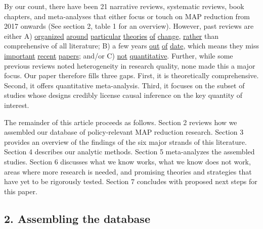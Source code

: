 \documentclass[
  letterpaper,
  DIV=11,
  numbers=noendperiod]{scrartcl}
\begin{document}
By our count, there have been 21 narrative reviews, systematic reviews,
book chapters, and meta-analyses that either focus or touch on MAP
reduction from 2017 onwards (See section 2, table 1 for an overview).
However, past reviews are either A)
\href{https://www.sciencedirect.com/science/article/abs/pii/S0195666318309309}{organized}
\href{https://animalcharityevaluators.org/wp-content/uploads/2022/04/protest-intervention-report.pdf}{around}
\href{https://animalcharityevaluators.org/wp-content/uploads/2022/04/leafleting-intervention-report.pdf}{particular}
\href{https://www.sciencedirect.com/science/article/pii/S0195666321001847}{theories}
\href{https://www.thelancet.com/journals/lanplh/article/PIIS2542-5196(18)30188-8/fulltext}{of}
\href{https://ijbnpa.biomedcentral.com/articles/10.1186/s12966-018-0729-6}{change},
\href{https://www.sciencedirect.com/science/article/abs/pii/B9780323988285000012}{rather}
than comprehensive of all literature; B) a few years
\href{https://www.sciencedirect.com/science/article/abs/pii/S0195666318315812}{out}
\href{https://www.sciencedirect.com/science/article/pii/S0195666321006462}{of}
\href{https://www.sciencedirect.com/science/article/abs/pii/S092422441830606X}{date},
which means they miss
\href{https://doi.org/10.1038/s43016-023-00712-1}{important}
\href{https://faunalytics.org/relative-effectiveness/}{recent}
\href{https://doi.org/10.1016/j.jenvp.2021.10159}{papers}; and/or C)
\href{https://doi.org/10.1016/j.tifs.2019.09.019}{not}
\href{https://www.sciencedirect.com/science/article/pii/S2666833521000976}{quantitative}.
Further, while some previous reviews noted heterogeneity in research
quality, none made this a major focus. Our paper therefore fills three
gaps. First, it is theoretically comprehensive. Second, it offers
quantitative meta-analysis. Third, it focuses on the subset of studies
whose designs credibly license causal inference on the key quantity of
interest.

The remainder of this article proceeds as follows. Section 2 reviews how
we assembled our database of policy-relevant MAP reduction research.
Section 3 provides an overview of the findings of the six major strands
of this literature. Section 4 describes our analytic methods. Section 5
meta-analyzes the assembled studies. Section 6 discusses what we know
works, what we know does not work, areas where more research is needed,
and promising theories and strategies that have yet to be rigorously
tested. Section 7 concludes with proposed next steps for this paper.

\hypertarget{assembling-the-database}{%
\subsection{2. Assembling the database}\label{assembling-the-database}}
\end{document}
